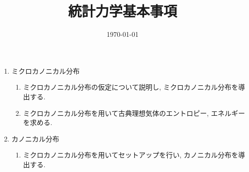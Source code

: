 \documentclass[11pt,a4paper]{jarticle}
\title{統計力学基本事項}
\author{}
\date{\today}
\begin{document}
\maketitle
\begin{enumerate}
    \item ミクロカノニカル分布
    \begin{enumerate}
        \item ミクロカノニカル分布の仮定について説明し, ミクロカノニカル分布を導出する.
        \item ミクロカノニカル分布を用いて古典理想気体のエントロピー, エネルギーを求める.
    \end{enumerate}
    \item カノニカル分布
    \begin{enumerate}
        \item ミクロカノニカル分布を用いてセットアップを行い, カノニカル分布を導出する.
    \end{enumerate}
\end{enumerate}
\end{document}
